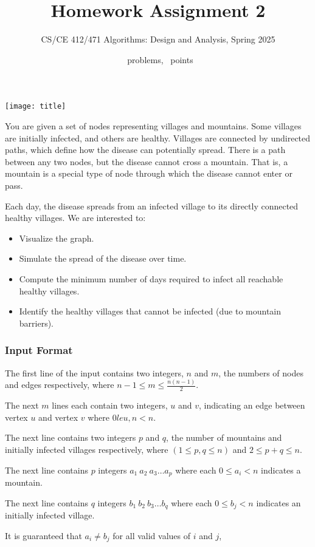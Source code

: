 \documentclass[a4paper]{exam}
\title{Homework Assignment 2}
\author{CS/CE 412/471 Algorithms: Design and Analysis, Spring 2025}
\date{\numquestions\ problems, \numpoints\ points}
\newcommand\heading[1]{\subsubsection*{#1}}
\begin{document}
\maketitle
\thispagestyle{empty}

\texttt{[image: title]}
\begin{questions}
  


  You are given a set of nodes representing villages and mountains. Some villages are initially infected, and others are healthy. Villages are connected by undirected paths, which define how the disease can potentially spread. There is a path between any two nodes, but the disease cannot cross a mountain. That is, a mountain is a special type of node through which the disease cannot enter or pass.
  
Each day, the disease spreads from an infected village to its directly connected healthy villages. We are interested to:
\begin{itemize}
\item Visualize the graph.
\item Simulate the spread of the disease over time.
\item Compute the minimum number of days required to infect all reachable healthy villages.
\item Identify the healthy villages that cannot be infected (due to mountain barriers).
\end{itemize}

\heading{Input Format}

The first line of the input contains two integers, $n$ and $m$, the numbers of nodes and edges respectively, where $n-1\le m\le \frac{n(n-1)}{2}$.

The next $m$ lines each contain two integers, $u$ and $v$, indicating an edge between vertex $u$ and vertex $v$ where $0 le u,n < n$.

The next line contains two integers $p$ and $q$, the number of mountains and initially infected villages respectively, where $(1\le p,q \le n)$ and $2\le p+q \le n$.

The next line contains $p$ integers $a_1\ a_2\ a_3\ldots a_p$ where each $0 \le a_i< n$ indicates a mountain.

The next line contains $q$ integers $b_1\ b_2\ b_3\ldots b_q$ where each $0 \le b_j< n$ indicates an initially infected village.

It is guaranteed that $a_i\ne b_j$ for all valid values of $i$ and $j$,


\end{questions}
\end{document}
